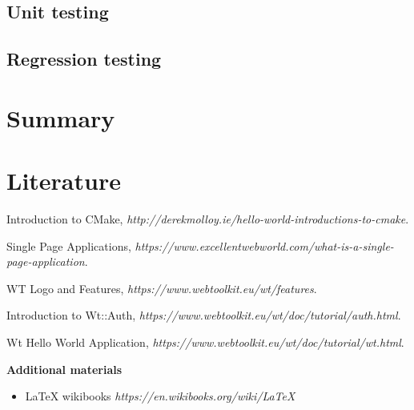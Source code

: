 \documentclass[a4paper,12pt]{article}
\begin{document}
\subsection{Unit testing}
\subsection{Regression testing}
\section{Summary}
\section{Literature}
{

\begin{thebibliography}{9}

  Introduction to CMake,
  \emph{http://derekmolloy.ie/hello-world-introductions-to-cmake}.
  
  Single Page Applications,
  \emph{https://www.excellentwebworld.com/what-is-a-single-page-application}.
  
  WT Logo and Features,
  \emph{https://www.webtoolkit.eu/wt/features}.

  Introduction to Wt::Auth,
  \emph{https://www.webtoolkit.eu/wt/doc/tutorial/auth.html}.
  
  Wt Hello World Application,
  \emph{https://www.webtoolkit.eu/wt/doc/tutorial/wt.html}.

\end{thebibliography}

\textbf{Additional materials} \begin{itemize}
	\item LaTeX wikibooks \newline \textit{https://en.wikibooks.org/wiki/LaTeX}

\end{itemize}

}
\newpage

\linespread{1.3}
\selectfont
\end{document}
